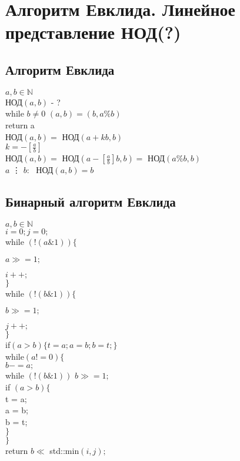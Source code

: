 \documentclass[12pt]{article}
\begin{document}
\setcounter{section}{1}
\section{Алгоритм Евклида. Линейное представление НОД(?)}

\subsection{Алгоритм Евклида}
\noindent $a, b \in \mathbb{N}$ \\
НОД$(a, b)$ - ? \\
while $b \ne 0$
$(a, b) = (b, a \% b)$\\
return a\\
НОД$(a, b) = $ НОД$(a + kb, b)$\\
$k = -[\frac{a}{b}]$\\
НОД$(a, b) = $ НОД$(a -[\frac{a}{b}]b, b) =$ НОД$(a \% b, b)$\\
$a $ \vdots $ $ $b: $ $ $ НОД$(a, b) = b$

\subsection{Бинарный алгоритм Евклида}
\noindent $a, b \in \mathbb{N}$\\
$i = 0; j = 0;$\\
while $(!(a \& 1))\{$
\par $a \gg = 1;$
\par $i++;$\\ $\}$\\
while $(!(b \& 1))\{$
\par $b \gg = 1;$
\par $j++;$\\ $\}$\\
if$(a > b) \{ t = a; a = b; b = t;\}$\\
while$(a != 0)\{$\\
\indent $b -= a;$\\
\indent while $(!(b \& 1))$ $b \gg = 1;$\\
\indent if $(a > b)\{$\\
\indent\indent t = a;\\
\indent\indent a = b;\\
\indent\indent b = t;\\
\indent $\}$\\
$\}$\\
return $b \ll$ std::min$(i, j);$
\end{document}
